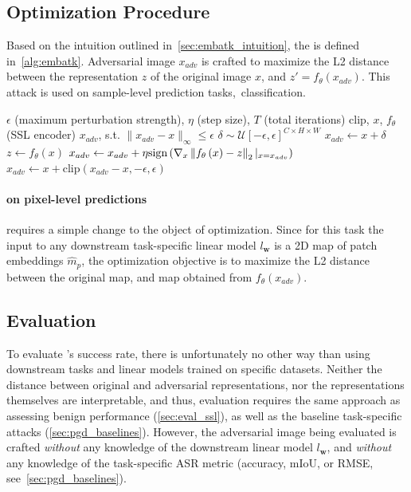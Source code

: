 \subsection{Optimization Procedure}

Based on the intuition outlined in~\cref{sec:embatk_intuition}, the \EmbedAttack is defined in~\cref{alg:embatk}. Adversarial image $x_{adv}$ is crafted to maximize the L2 distance between the representation $z$ of the original image $x$, and $z'=f_\theta(x_{adv})$. This attack is used on sample-level prediction tasks,~\eg classification. 

\begin{algorithm}
\caption{\EmbedAttack algorithm.}
\label{alg:embatk}
\begin{algorithmic}
    \Require $\epsilon$ (maximum perturbation strength), $\eta$ (step size), $T$ (total iterations)
    \Require clip, $x$, $f_\theta$ (SSL encoder)
    \Ensure $x_{adv}$, s.t. $\|x_{adv}-x\|_\infty\leq\epsilon$
    \State $\delta\sim\mathcal{U}[-\epsilon, \epsilon]^{C\times H\times W}$ 
    \State $x_{adv}\gets x+\delta$ 
    \State $z\gets f_\theta(x)$ 
        \State $x_{adv}\gets x_{adv}+\eta{\text{sign}}\left(
            \nabla_x\left\|f_\theta\left(x\right)-z\right\|_2|_{x=x_{adv}}
            \right)$ 
        \State $x_{adv}\gets x+\text{clip}(x_{adv}-x,-\epsilon,\epsilon)$ 
    \EndFor
\end{algorithmic}
\end{algorithm}

\paragraph{\EmbedAttack on pixel-level predictions} requires a simple change to the object of optimization. Since for this task the input to any downstream task-specific linear model $l_\mathbf{w}$ is a 2D map of patch embeddings $\hat{m}_p$, the optimization objective is to maximize the L2 distance between the original map, and map obtained from $f_\theta(x_{adv})$.

\subsection{Evaluation}

To evaluate \EmbedAttack's success rate, there is unfortunately no other way than using downstream tasks and linear models trained on specific datasets. Neither the distance between original and adversarial representations, nor the representations themselves are interpretable, and thus, evaluation requires the same approach as assessing benign performance (\cref{sec:eval_ssl}), as well as the baseline task-specific attacks (\cref{sec:pgd_baselines}). However, the adversarial image being evaluated is crafted \textit{without} any knowledge of the downstream linear model $l_\mathbf{w}$, and \textit{without} any knowledge of the task-specific ASR metric (accuracy, mIoU, or RMSE, see~\cref{sec:pgd_baselines}).

